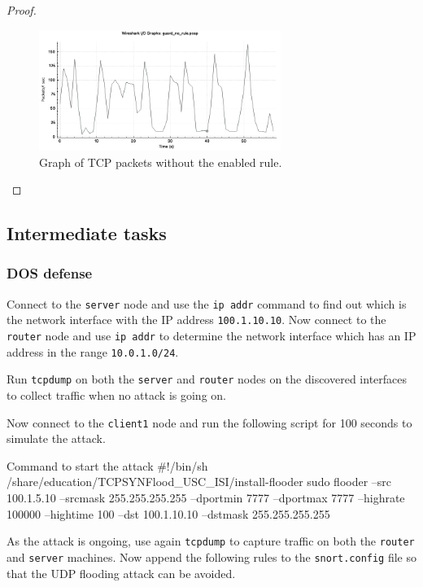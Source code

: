 \documentclass[a4paper,11pt,hidelinks]{article}
\begin{document}
\begin{proof}
    \begin{figure}[ht!]
        \centering
        \includegraphics[width=0.7\textwidth]{../drawable/guard_no_rule.png}
        \caption{Graph of TCP packets without the enabled rule.}
        \label{fig:norule}
    \end{figure}
\end{proof}

\clearpage
\newpage

\subsection{Intermediate tasks}

\subsubsection{DOS defense}
\label{subsub:dos}

Connect to the \texttt{server} node and use the \texttt{ip addr} command to find out which is the network interface with the IP address \texttt{100.1.10.10}. Now connect to the \texttt{router} node and use \texttt{ip addr} to determine the network interface which has an IP address in the range \texttt{10.0.1.0/24}.

Run \texttt{tcpdump} on both the \texttt{server} and \texttt{router} nodes on the discovered interfaces to collect traffic when no attack is going on.

Now connect to the \texttt{client1} node and run the following script for 100 seconds to simulate the attack.

\begin{code}{Command to start the attack}
#!/bin/sh
/share/education/TCPSYNFlood_USC_ISI/install-flooder
sudo flooder --src 100.1.5.10 --srcmask 255.255.255.255 --dportmin 7777
    --dportmax 7777 --highrate 100000 --hightime 100
    --dst 100.1.10.10 --dstmask 255.255.255.255
\end{code}

As the attack is ongoing, use again \texttt{tcpdump} to capture traffic on both the \texttt{router} and \texttt{server} machines. Now append the following rules to the \texttt{snort.config} file so that the UDP flooding attack can be avoided.
\end{document}
